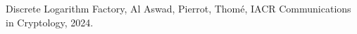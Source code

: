 \documentclass[preview]{standalone}
\begin{document}
Discrete Logarithm Factory, Al Aswad, Pierrot, Thomé, IACR Communications in Cryptology, 2024.\\
\end{document}
